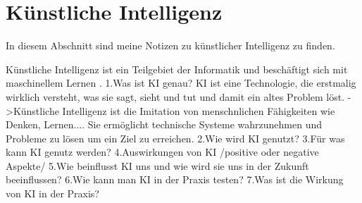 \section{Künstliche Intelligenz}
\label{sec:ai}

In diesem Abschnitt sind meine Notizen zu künstlicher Intelligenz zu finden.

Künstliche Intelligenz ist ein Teilgebiet der Informatik und beschäftigt sich mit maschinellem Lernen \citep{ai-wikipedia}.
1.Was ist KI genau?
KI ist eine Technologie, die erstmalig wirklich versteht, was sie sagt, sieht und tut und damit ein altes Problem löst.
->Künstliche Intelligenz ist die Imitation von menschnlichen Fähigkeiten wie Denken, Lernen.... Sie ermöglicht technische Systeme wahrzunehmen und Probleme zu lösen um ein Ziel zu erreichen.
2.Wie wird KI genutzt?
3.Für was kann KI genutz werden?
4.Auswirkungen von KI /positive oder negative Aspekte/
5.Wie beinflusst KI uns und wie wird sie uns in der Zukunft beeinflussen?
6.Wie kann man KI in der Praxis testen?
7.Was ist die Wirkung von KI in der Praxis?
